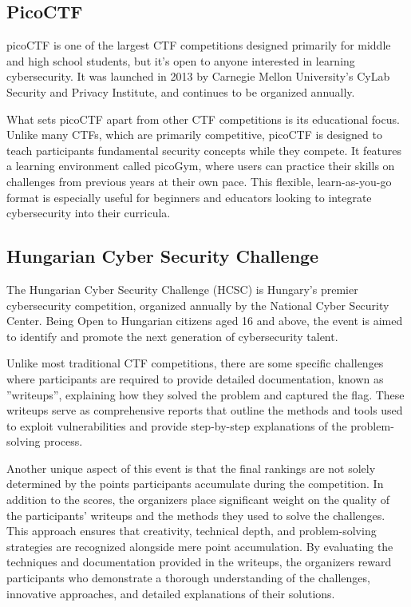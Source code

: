 \documentclass[conference]{IEEEtran}
\begin{document}
\subsection{PicoCTF}

picoCTF is one of the largest CTF competitions designed
primarily for middle and high school students, but it’s open to anyone
interested in learning cybersecurity. It was launched in 2013 \cite{zhang2013}
by Carnegie Mellon
University’s CyLab Security and Privacy Institute, and continues to be organized annually.

What sets picoCTF apart from other CTF competitions is its educational focus.
Unlike many CTFs, which are primarily competitive, picoCTF is designed to teach
participants fundamental security concepts while they compete. It features a
learning environment called picoGym, where users can practice their skills on
challenges from previous years at their own pace. This flexible,
learn-as-you-go format is especially useful for beginners and educators looking
to integrate cybersecurity into their curricula.

\subsection{Hungarian Cyber Security Challenge}

The Hungarian Cyber Security Challenge (HCSC) is Hungary’s premier
cybersecurity competition, organized annually by the National Cyber Security
Center. Being Open to Hungarian citizens aged 16 and above, the event is
aimed to identify and promote the next generation of
cybersecurity talent. 

Unlike most traditional CTF competitions, there are some specific challenges
where participants are required to provide detailed documentation, known as
''writeups'', explaining how they solved the problem and captured the flag. These
writeups serve as comprehensive reports that outline the methods and tools used
to exploit vulnerabilities and provide step-by-step explanations of the
problem-solving process.

Another unique aspect of this event is that the final rankings are not solely
determined by the points participants accumulate during the competition. In
addition to the scores, the organizers place significant weight on the quality
of the participants' writeups and the methods they used to solve the
challenges. This approach ensures that creativity, technical depth, and
problem-solving strategies are recognized alongside mere point accumulation.
By evaluating the techniques and documentation provided in the writeups, the
organizers reward participants who demonstrate a thorough understanding of the
challenges, innovative approaches, and detailed explanations of their
solutions.
\end{document}
